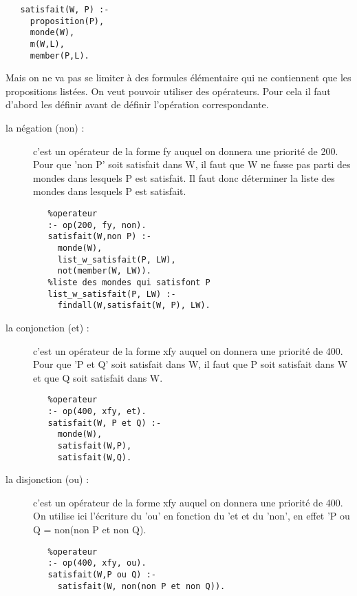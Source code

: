 \documentclass[a4paper,10pt]{article}
\begin{document}
   \begin{lstlisting}
   satisfait(W, P) :-
     proposition(P),
     monde(W),
     m(W,L),
     member(P,L).
   \end{lstlisting}
   
   Mais on ne va pas se limiter \`{a} des formules \'{e}l\'{e}mentaire qui ne contiennent que les propositions list\'{e}es. On veut pouvoir utiliser des op\'{e}rateurs.
   Pour cela il faut d'abord les d\'{e}finir avant de d\'{e}finir l'op\'{e}ration correspondante.
   \begin{description}
    \item[la n\'{e}gation (non) :] c'est un op\'{e}rateur de la forme fy auquel on donnera une priorit\'{e} de 200. Pour que 'non P' soit satisfait dans W,
    il faut que W ne fasse pas parti des mondes dans lesquels P est satisfait. Il faut donc d\'{e}terminer la liste des mondes dans lesquels P est satisfait.
    
       \begin{lstlisting}
   %operateur
   :- op(200, fy, non).
   satisfait(W,non P) :-
     monde(W),
     list_w_satisfait(P, LW), 
     not(member(W, LW)).
   %liste des mondes qui satisfont P
   list_w_satisfait(P, LW) :-
     findall(W,satisfait(W, P), LW).
       \end{lstlisting}
       
    \item[la conjonction (et) :] c'est un op\'{e}rateur de la forme xfy auquel on donnera une priorit\'{e} de 400. Pour que 'P et Q' soit satisfait dans W,
    il faut que P soit satisfait dans W et que Q soit satisfait dans W.
    
       \begin{lstlisting}
   %operateur
   :- op(400, xfy, et).
   satisfait(W, P et Q) :-
     monde(W),
     satisfait(W,P),
     satisfait(W,Q).
       \end{lstlisting}
       
    \item[la disjonction (ou) :] c'est un op\'{e}rateur de la forme xfy auquel on donnera une priorit\'{e} de 400. On utilise ici l'\'{e}criture du 'ou'
    en fonction du 'et et du 'non', en effet 'P ou Q = non(non P et non Q).
    
       \begin{lstlisting}
   %operateur
   :- op(400, xfy, ou).
   satisfait(W,P ou Q) :-
     satisfait(W, non(non P et non Q)).
       \end{lstlisting}
       

\end{description}
\end{document}
